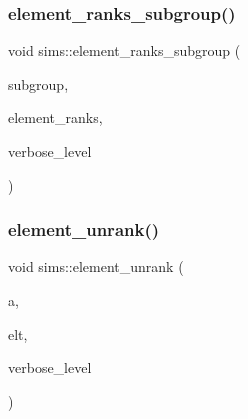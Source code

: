 \mbox{\label{classsims_ad683b221a956be18edb47de57bf8821a}} 
\subsubsection{\texorpdfstring{element\+\_\+ranks\+\_\+subgroup()}{element\_ranks\_subgroup()}}
{\footnotesize\ttfamily void sims\+::element\+\_\+ranks\+\_\+subgroup (\begin{DoxyParamCaption}\item[{\mbox{\hyperlink{classsims}{sims}} $\ast$}]{subgroup,  }\item[{\mbox{\hyperlink{galois_8h_a09fddde158a3a20bd2dcadb609de11dc}{I\+NT}} $\ast$}]{element\+\_\+ranks,  }\item[{\mbox{\hyperlink{galois_8h_a09fddde158a3a20bd2dcadb609de11dc}{I\+NT}}}]{verbose\+\_\+level }\end{DoxyParamCaption})}

\mbox{\label{classsims_ae7e72ffe2204f17d3e4d19360c59f147}} 
\subsubsection{\texorpdfstring{element\+\_\+unrank()}{element\_unrank()}\hspace{0.1cm}{\footnotesize\ttfamily [1/2]}}
{\footnotesize\ttfamily void sims\+::element\+\_\+unrank (\begin{DoxyParamCaption}\item[{\mbox{\hyperlink{classlonginteger__object}{longinteger\+\_\+object}} \&}]{a,  }\item[{\mbox{\hyperlink{galois_8h_a09fddde158a3a20bd2dcadb609de11dc}{I\+NT}} $\ast$}]{elt,  }\item[{\mbox{\hyperlink{galois_8h_a09fddde158a3a20bd2dcadb609de11dc}{I\+NT}}}]{verbose\+\_\+level }\end{DoxyParamCaption})}

\mbox{\label{classsims_ae4ed39ddd4f985a306c6edae4d9f167e}} 
